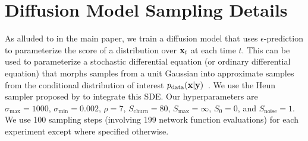 \chapter{Diffusion Model Sampling Details}
As alluded to in the main paper, we train a diffusion model that uses $\epsilon$-prediction to parameterize the score of a distribution over $\mathbf{x}_t$ at each time $t$. This can be used to parameterize a stochastic differential equation (or ordinary differential equation) that morphs samples from a unit Gaussian into approximate samples from the conditional distribution of interest $p_\text{data}(\mathbf{x}|\mathbf{y})$~\cite{song2020score}. We use the Heun sampler proposed by \cite{karras2022elucidating} to integrate this SDE. Our hyperparameters are $\sigma_\text{max}=1000$, $\sigma_\text{min} = 0.002$, $\rho=7$, $S_\text{churn}=80$, $S_\text{max}=\infty$, $S_0=0$, and $S_\text{noise}=1$. We use 100 sampling steps (involving 199 network function evaluations) for each experiment except where specified otherwise. 



